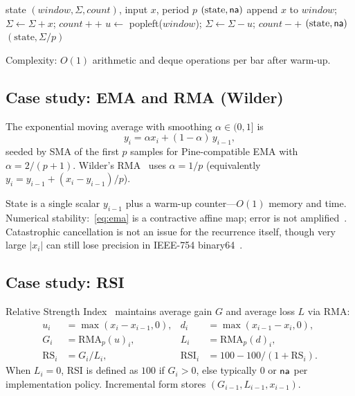 \documentclass[11pt,a4paper]{article}
\begin{document}
\begin{algorithm}[t]
\caption{Incremental SMA with running sum}
\label{alg:sma}
\begin{algorithmic}[1]
\Require state $(\mathit{window},\Sigma,\mathit{count})$, input $x$, period $p$
  \State \Return $(\text{state}, \textsf{na})$ 
\EndIf
\State append $x$ to $\mathit{window}$; $\Sigma\gets\Sigma+x$; $\mathit{count}{+}{+}$
  \State $u\gets$ popleft($\mathit{window}$); $\Sigma\gets\Sigma-u$; $\mathit{count}{-}{+}$
\EndIf
{}
  \State \Return $(\text{state}, \textsf{na})$
\EndIf
\State \Return $(\text{state}, \Sigma/p)$
\end{algorithmic}
\end{algorithm}

Complexity: $O(1)$ arithmetic and deque operations per bar after warm-up.

\subsection{Case study: EMA and RMA (Wilder)}
\label{sec:inc-ema}

The exponential moving average with smoothing $\alpha\in(0,1]$ is
\begin{equation}
\label{eq:ema}
  y_i = \alpha x_i + (1-\alpha)\, y_{i-1},
\end{equation}
seeded by SMA of the first $p$ samples for Pine-compatible EMA with
$\alpha=2/(p+1)$.  Wilder's RMA~\citep{wilder1978new} uses
$\alpha=1/p$ (equivalently $y_i = y_{i-1} + (x_i-y_{i-1})/p$).

State is a single scalar $y_{i-1}$ plus a warm-up counter---$O(1)$ memory and
time.  Numerical stability:~\eqref{eq:ema} is a contractive affine map; error
is not amplified~\citep{higham2002accuracy}.  Catastrophic cancellation is not
an issue for the recurrence itself, though very large $|x_i|$ can still lose
precision in IEEE-754 binary64~\citep{ieee754}.

\subsection{Case study: RSI}
\label{sec:inc-rsi}

Relative Strength Index~\citep{wilder1978new} maintains average gain $G$ and
average loss $L$ via RMA:
\begin{align}
  u_i &= \max(x_i-x_{i-1}, 0), &
  d_i &= \max(x_{i-1}-x_i, 0), \\
  G_i &= \mathrm{RMA}_p(u)_i, &
  L_i &= \mathrm{RMA}_p(d)_i, \\
  \mathrm{RS}_i &= G_i/L_i, &
  \mathrm{RSI}_i &= 100 - 100/(1+\mathrm{RS}_i).
\end{align}
When $L_i=0$, RSI is defined as $100$ if $G_i>0$, else typically $0$ or $\textsf{na}$
per implementation policy.  Incremental form stores
$(G_{i-1},L_{i-1},x_{i-1})$.
\end{document}
